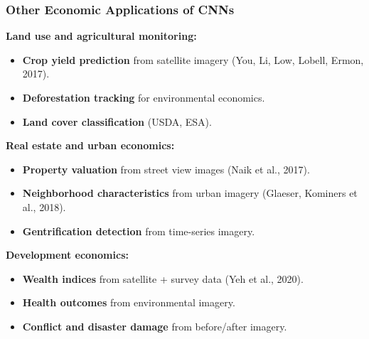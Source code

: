 \documentclass[notes,11pt, aspectratio=169]{beamer}
\begin{document}
\begin{frame}
\frametitle{Other Economic Applications of CNNs}

\textbf{Land use and agricultural monitoring:}
\begin{itemize}
    \item \textbf{Crop yield prediction} from satellite imagery (You, Li, Low, Lobell, Ermon, 2017).
    \item \textbf{Deforestation tracking} for environmental economics.
    \item \textbf{Land cover classification} (USDA, ESA).
\end{itemize}

\vspace{6pt}
\textbf{Real estate and urban economics:}
\begin{itemize}
    \item \textbf{Property valuation} from street view images (Naik et al., 2017).
    \item \textbf{Neighborhood characteristics} from urban imagery (Glaeser, Kominers et al., 2018).
    \item \textbf{Gentrification detection} from time-series imagery.
\end{itemize}

\vspace{6pt}
\textbf{Development economics:}
\begin{itemize}
    \item \textbf{Wealth indices} from satellite + survey data (Yeh et al., 2020).
    \item \textbf{Health outcomes} from environmental imagery.
    \item \textbf{Conflict and disaster damage} from before/after imagery.
\end{itemize}
\end{frame}
\end{document}
